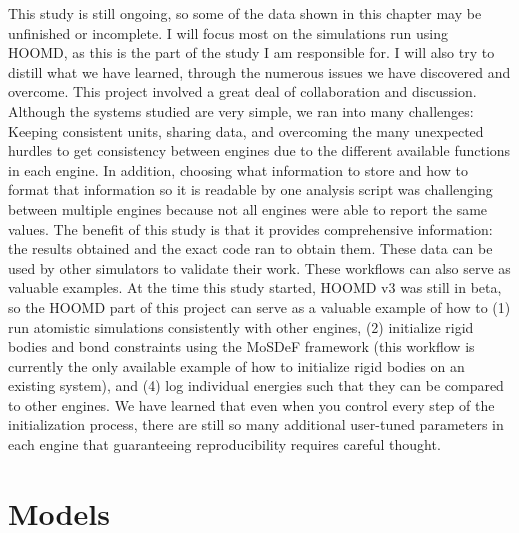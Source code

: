 This study is still ongoing, so some of the data shown in this chapter may be unfinished or incomplete. 
I will focus most on the simulations run using HOOMD, as this is the part of the study I am responsible for.
I will also try to distill what we have learned, through the numerous issues we have discovered and overcome. 
This project involved a great deal of collaboration and discussion.
Although the systems studied are very simple, we ran into many challenges:
Keeping consistent units, sharing data, and overcoming the many unexpected hurdles to get consistency between engines due to the different available functions in each engine. %
In addition, choosing what information to store and how to format that information so it is readable by one analysis script was challenging between multiple engines because not all engines were able to report the same values.
The benefit of this study is that it provides comprehensive information: the results obtained and the exact code ran to obtain them. 
These data can be used by other simulators to validate their work.
These workflows can also serve as valuable examples. 
At the time this study started, HOOMD v3 was still in beta, so the HOOMD part of this project can serve as a valuable example of how to (1) run atomistic simulations consistently with other engines, (2) initialize rigid bodies and bond constraints using the MoSDeF framework (this workflow is currently the only available example of how to initialize rigid bodies on an existing system), and (4) log individual energies such that they can be compared to other engines. 
We have learned that even when you control every step of the initialization process, there are still so many additional user-tuned parameters in each engine that guaranteeing reproducibility requires careful thought.

\section{Models}


